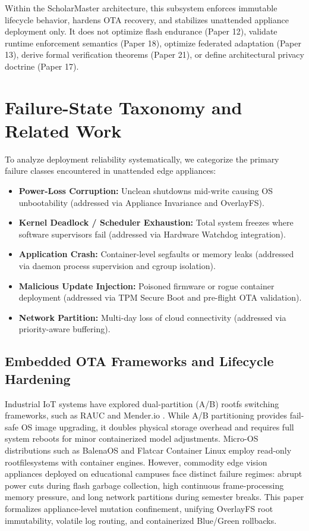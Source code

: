 \documentclass[conference]{IEEEtran}
\begin{document}
Within the ScholarMaster architecture, this subsystem enforces immutable lifecycle behavior, hardens OTA recovery, and stabilizes unattended appliance deployment only. It does not optimize flash endurance (Paper 12), validate runtime enforcement semantics (Paper 18), optimize federated adaptation (Paper 13), derive formal verification theorems (Paper 21), or define architectural privacy doctrine (Paper 17).

\section{Failure-State Taxonomy and Related Work}

To analyze deployment reliability systematically, we categorize the primary failure classes encountered in unattended edge appliances:
\begin{itemize}
    \item \textbf{Power-Loss Corruption:} Unclean shutdowns mid-write causing OS unbootability (addressed via Appliance Invariance and OverlayFS).
    \item \textbf{Kernel Deadlock / Scheduler Exhaustion:} Total system freezes where software supervisors fail (addressed via Hardware Watchdog integration).
    \item \textbf{Application Crash:} Container-level segfaults or memory leaks (addressed via daemon process supervision and cgroup isolation).
    \item \textbf{Malicious Update Injection:} Poisoned firmware or rogue container deployment (addressed via TPM Secure Boot and pre-flight OTA validation).
    \item \textbf{Network Partition:} Multi-day loss of cloud connectivity (addressed via priority-aware buffering).
\end{itemize}

\subsection{Embedded OTA Frameworks and Lifecycle Hardening}
Industrial IoT systems have explored dual-partition (A/B) rootfs switching frameworks, such as RAUC \cite{b25} and Mender.io \cite{b26}. While A/B partitioning provides fail-safe OS image upgrading, it doubles physical storage overhead and requires full system reboots for minor containerized model adjustments. Micro-OS distributions such as BalenaOS \cite{b27} and Flatcar Container Linux \cite{b28} employ read-only rootfilesystems with container engines. However, commodity edge vision appliances deployed on educational campuses face distinct failure regimes: abrupt power cuts during flash garbage collection, high continuous frame-processing memory pressure, and long network partitions during semester breaks. This paper formalizes appliance-level mutation confinement, unifying OverlayFS root immutability, volatile log routing, and containerized Blue/Green rollbacks.
\end{document}
